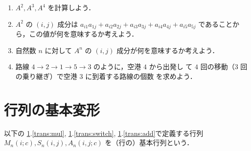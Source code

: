 \documentclass[11pt, uplatex, dvipdfmx]{jsarticle}
\begin{document}
\begin{enumerate}
\begin{enumerate}[(1)]
  \item $A^2, A^3, A^4$ を計算しよう．

  \item $A^2$ の $(i,j)$ 成分は
    $a_{i1} a_{1j} + a_{i2}a_{2j} + a_{i3}a_{3j} + a_{i4}a_{4j} +
    a_{i5}a_{5j}$ であることから，この値が何を意味するか考えよう．

  \item 自然数 $n$ に対して $A^n$ の $(i,j)$ 成分が何を意味するか考えよう．

  \item 路線 $4 \to 2 \to 1 \to 5 \to 3$ のように，空港 $4$ から出発し
    て $4$ 回の移動（$3$ 回の乗り継ぎ）で空港 $3$ に到着する路線の個数
    を求めよう．
  \end{enumerate}


\end{enumerate}

\section{行列の基本変形}\label{sec:transform}

以下の \ref{sec:transform}.\ref{trans:mul},
\ref{sec:transform}.\ref{trans:switch},
\ref{sec:transform}.\ref{trans:add}で定義する行列
$M_n(i;c), S_n(i,j), A_n(i,j;c)$ を（行の）基本行列という．
\end{document}
